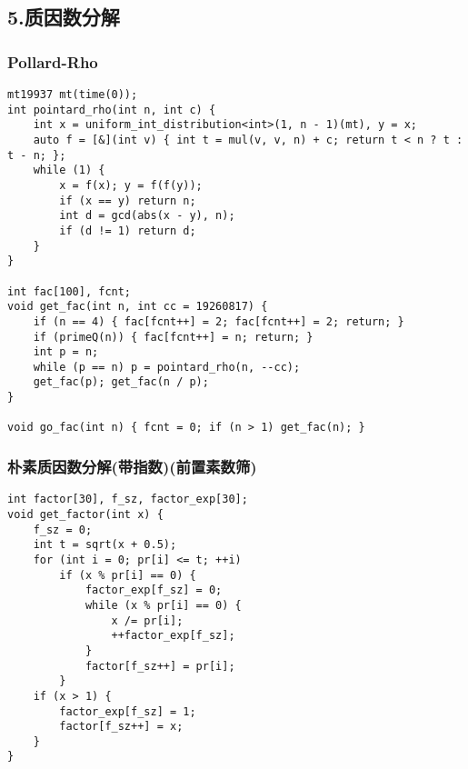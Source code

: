 \documentclass[]{article}
\begin{document}
\hypertarget{ux8d28ux56e0ux6570ux5206ux89e3}{%
\subsection{5.质因数分解}\label{ux8d28ux56e0ux6570ux5206ux89e3}}

\hypertarget{pollard-rho}{%
\subsubsection{Pollard-Rho}\label{pollard-rho}}

\begin{verbatim}
mt19937 mt(time(0));
int pointard_rho(int n, int c) {
    int x = uniform_int_distribution<int>(1, n - 1)(mt), y = x;
    auto f = [&](int v) { int t = mul(v, v, n) + c; return t < n ? t : t - n; };
    while (1) {
        x = f(x); y = f(f(y));
        if (x == y) return n;
        int d = gcd(abs(x - y), n);
        if (d != 1) return d;
    }
}

int fac[100], fcnt;
void get_fac(int n, int cc = 19260817) {
    if (n == 4) { fac[fcnt++] = 2; fac[fcnt++] = 2; return; }
    if (primeQ(n)) { fac[fcnt++] = n; return; }
    int p = n;
    while (p == n) p = pointard_rho(n, --cc);
    get_fac(p); get_fac(n / p);
}

void go_fac(int n) { fcnt = 0; if (n > 1) get_fac(n); }
\end{verbatim}

\hypertarget{ux6734ux7d20ux8d28ux56e0ux6570ux5206ux89e3ux5e26ux6307ux6570ux524dux7f6eux7d20ux6570ux7b5b}{%
\subsubsection{朴素质因数分解(带指数)(前置素数筛)}\label{ux6734ux7d20ux8d28ux56e0ux6570ux5206ux89e3ux5e26ux6307ux6570ux524dux7f6eux7d20ux6570ux7b5b}}

\begin{verbatim}
int factor[30], f_sz, factor_exp[30];
void get_factor(int x) {
    f_sz = 0;
    int t = sqrt(x + 0.5);
    for (int i = 0; pr[i] <= t; ++i)
        if (x % pr[i] == 0) {
            factor_exp[f_sz] = 0;
            while (x % pr[i] == 0) {
                x /= pr[i];
                ++factor_exp[f_sz];
            }
            factor[f_sz++] = pr[i];
        }
    if (x > 1) {
        factor_exp[f_sz] = 1;
        factor[f_sz++] = x;
    }
}
\end{verbatim}
\end{document}
